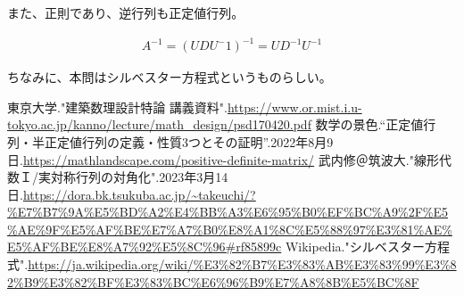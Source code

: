 \documentclass[a4paper, 10pt, dvipdfmx]{jlreq}
\begin{document}
また、正則であり、逆行列も正定値行列。

\begin{align*}
    A^{-1}=(UDU^-1)^{-1}=UD^{-1}U^{-1}
\end{align*}

ちなみに、本問はシルベスター方程式というものらしい。


\begin{thebibliography}{9}
    東京大学."建築数理設計特論 講義資料".\url{https://www.or.mist.i.u-tokyo.ac.jp/kanno/lecture/math_design/psd170420.pdf}
    数学の景色.“正定値行列・半正定値行列の定義・性質3つとその証明”.2022年8月9日.\url{https://mathlandscape.com/positive-definite-matrix/}
    武内修＠筑波大."線形代数Ｉ/実対称行列の対角化".2023年3月14日.\url{https://dora.bk.tsukuba.ac.jp/~takeuchi/?%E7%B7%9A%E5%BD%A2%E4%BB%A3%E6%95%B0%EF%BC%A9%2F%E5%AE%9F%E5%AF%BE%E7%A7%B0%E8%A1%8C%E5%88%97%E3%81%AE%E5%AF%BE%E8%A7%92%E5%8C%96#rf85899c}
    Wikipedia."シルベスター方程式".\url{https://ja.wikipedia.org/wiki/%E3%82%B7%E3%83%AB%E3%83%99%E3%82%B9%E3%82%BF%E3%83%BC%E6%96%B9%E7%A8%8B%E5%BC%8F}
\end{thebibliography}
\end{document}
